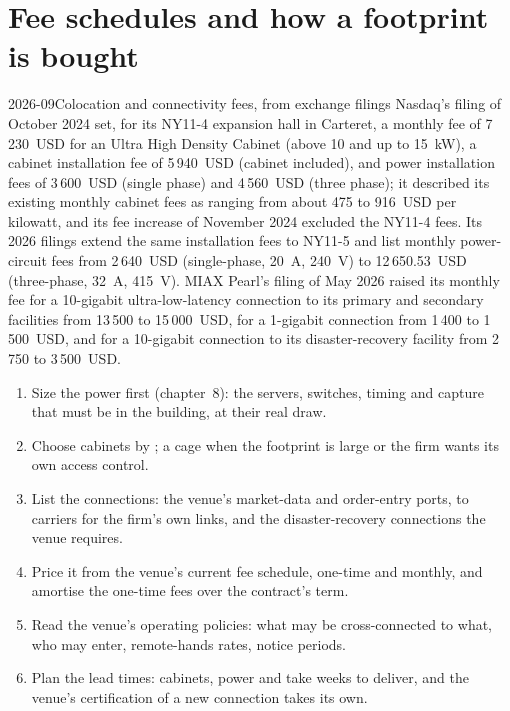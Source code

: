 \section{Fee schedules and how a footprint is bought}

\begin{dated}{2026-09}{Colocation and connectivity fees, from exchange filings}\label{dat:nw:colocation-products-and-how-they-are-sold:fees}
Nasdaq's filing of October 2024 set, for its NY11-4 expansion hall in Carteret, a monthly fee of 7\,230~USD for an Ultra High Density
Cabinet (above 10 and up to \qty{15}{\kilo\watt}), a cabinet installation fee of 5\,940~USD (cabinet included), and power installation fees of
3\,600~USD (single phase) and 4\,560~USD (three phase); it described its existing monthly cabinet fees as ranging from about 475 to 916~USD
per kilowatt, and its fee increase of November 2024 excluded the NY11-4 fees. Its 2026 filings extend the same installation fees to NY11-5
and list monthly power-circuit fees from 2\,640~USD (single-phase, 20~A, 240~V) to 12\,650.53~USD (three-phase, 32~A, 415~V). MIAX Pearl's
filing of May 2026 raised its monthly fee for a 10-gigabit ultra-low-latency connection to its primary and secondary facilities from
13\,500 to 15\,000~USD, for a 1-gigabit connection from 1\,400 to 1\,500~USD, and for a 10-gigabit connection to its disaster-recovery
facility from 2\,750 to 3\,500~USD.
\end{dated}

\begin{method}\label{met:nw:colocation-products-and-how-they-are-sold:buy}
\begin{enumerate}
\item Size the power first (chapter~8): the servers, switches, timing and capture that must be in the building, at their real draw.
\item Choose cabinets by ; a cage when the footprint is large or the firm wants its own access control.
\item List the connections: the venue's market-data and order-entry ports,  to carriers for the firm's own links, and the
  disaster-recovery connections the venue requires.
\item Price it from the venue's current fee schedule, one-time and monthly, and amortise the one-time fees over the contract's term.
\item Read the venue's operating policies: what may be cross-connected to what, who may enter, remote-hands rates, notice periods.
\item Plan the lead times: cabinets, power and  take weeks to deliver, and the venue's certification of a new connection
  takes its own.
\end{enumerate}
\end{method}


